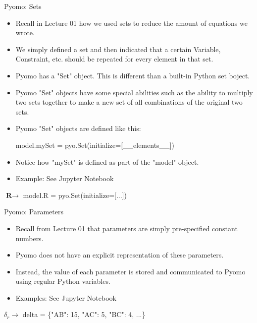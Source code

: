 \documentclass[10pt, aspectratio=169]{beamer}
\begin{document}
\begin{frame}{Pyomo: Sets}
    \begin{itemize}
        \item Recall in Lecture 01 how we used sets to reduce the amount of equations we wrote.
        \item We simply defined a set and then indicated that a certain Variable, Constraint, etc. should be repeated for every element in that set.
        \item Pyomo has a "Set" object. This is different than a built-in Python set boject.
        \item Pyomo "Set" objects have some special abilities such as the ability to multiply two sets together to make a new set of all combinations of the original two sets.
        \item Pyomo "Set" objects are defined like this:
        
        \hspace{0.25cm} model.mySet = pyo.Set(initialize=[\_\_elements\_\_])

        \item Notice how "mySet" is defined as part of the "model" object.
        \item Example: See Jupyter Notebook
    \end{itemize}

    \begin{center}
        $\textbf{R} \rightarrow $ model.R = pyo.Set(initialize=[...])
    \end{center}
\end{frame}

\begin{frame}{Pyomo: Parameters}
    \begin{itemize}
        \item Recall from Lecture 01 that parameters are simply pre-specified constant numbers.
        \item Pyomo does not have an explicit representation of these parameters.
        \item Instead, the value of each parameter is stored and communicated to Pyomo using regular Python variables.
        \item Examples: See Jupyter Notebook
    \end{itemize}
    \begin{center}
        $\delta_r \rightarrow $ delta = \{"AB": 15, "AC": 5, "BC": 4, ...\}
    \end{center}
\end{frame}
\end{document}
